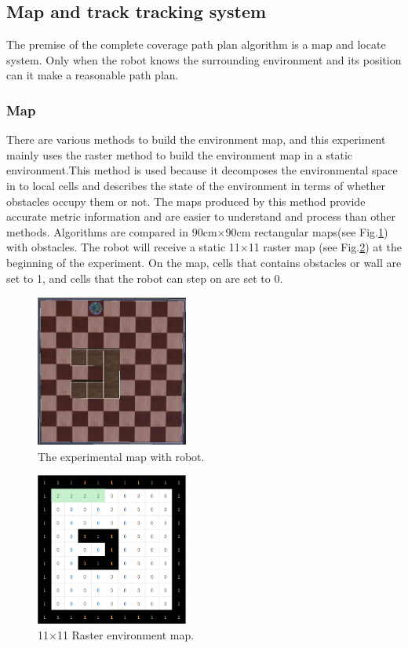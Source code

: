 \documentclass[conference]{IEEEtran}
\begin{document}
\subsection{Map and track tracking system}

The premise of the complete coverage path plan algorithm is a map and locate system. Only when the robot knows the surrounding environment and its position can it make a reasonable path plan.

\subsubsection{Map}

There are various methods to build the environment map, and this experiment mainly uses the raster method\cite{hart1968formal} to build the environment map in a static environment.This method is used because it decomposes the environmental space in to local cells and describes the state of the environment in terms of whether obstacles occupy them or not. The maps produced by this method provide accurate metric information and are easier to understand and process than other methods. Algorithms are compared in 90cm×90cm rectangular maps(see Fig.\ref{fig1}) with obstacles. The robot will receive a static 11×11 raster map (see Fig.\ref{fig2}) at the beginning of the experiment. On the map, cells that contains obstacles or wall are set to 1, and cells that the robot can step on are set to 0.

\begin{figure}[htbp]
\centerline{\includegraphics[width=5cm,height=5cm]{RS_Report/room_1.png}}
\caption{The experimental map with robot.}
\label{fig1}
\end{figure}

\begin{figure}[htbp]
\setlength{\belowcaptionskip}{-1cm}
\centerline{\includegraphics[width=5cm,height=5cm]{RS_Report/map_demenstration.png}}
\caption{11$\times$11 Raster environment map.}
\label{fig2}
\end{figure}
\end{document}

